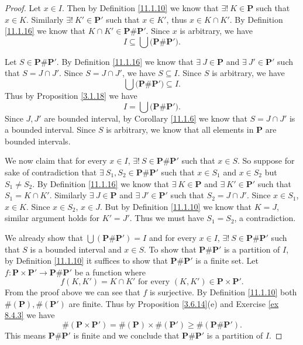 \begin{proof}
    Let \(x \in I\).
    Then by Definition \ref{11.1.10} we know that \(\exists!\ K \in \mathbf{P}\) such that \(x \in K\).
    Similarly \(\exists!\ K' \in \mathbf{P}'\) such that \(x \in K'\), thus \(x \in K \cap K'\).
    By Definition \ref{11.1.16} we know that \(K \cap K' \in \mathbf{P} \# \mathbf{P}'\).
    Since \(x\) is arbitrary, we have
    \[
        I \subseteq \bigcup \big(\mathbf{P} \# \mathbf{P}'\big).
    \]

    Let \(S \in \mathbf{P} \# \mathbf{P}'\).
    By Definition \ref{11.1.16} we know that \(\exists\ J \in \mathbf{P}\) and \(\exists\ J' \in \mathbf{P}'\) such that \(S = J \cap J'\).
    Since \(S = J \cap J'\), we have \(S \subseteq I\).
    Since \(S\) is arbitrary, we have
    \[
        \bigcup \big(\mathbf{P} \# \mathbf{P}'\big) \subseteq I.
    \]
    Thus by Proposition \ref{3.1.18} we have
    \[
        I = \bigcup \big(\mathbf{P} \# \mathbf{P}'\big).
    \]
    Since \(J, J'\) are bounded interval, by Corollary \ref{11.1.6} we know that \(S = J \cap J'\) is a bounded interval.
    Since \(S\) is arbitrary, we know that all elements in \(\mathbf{P}\) are bounded intervals.

    We now claim that for every \(x \in I\), \(\exists!\ S \in \mathbf{P} \# \mathbf{P}'\) such that \(x \in S\).
    So suppose for sake of contradiction that \(\exists\ S_1, S_2 \in \mathbf{P} \# \mathbf{P}'\) such that \(x \in S_1\) and \(x \in S_2\) but \(S_1 \neq S_2\).
    By Definition \ref{11.1.16} we know that \(\exists\ K \in \mathbf{P}\) and \(\exists\ K' \in \mathbf{P}'\) such that \(S_1 = K \cap K'\).
    Similarly \(\exists\ J \in \mathbf{P}\) and \(\exists\ J' \in \mathbf{P}'\) such that \(S_2 = J \cap J'\).
    Since \(x \in S_1\), \(x \in K\).
    Since \(x \in S_2\), \(x \in J\).
    But by Definition \ref{11.1.10} we know that \(K = J\), similar argument holds for \(K' = J'\).
    Thus we must have \(S_1 = S_2\), a contradiction.

    We already show that \(\bigcup (\mathbf{P} \# \mathbf{P}') = I\) and for every \(x \in I\), \(\exists!\ S \in \mathbf{P} \# \mathbf{P}'\) such that \(S\) is a bounded interval and \(x \in S\).
    To show that \(\mathbf{P} \# \mathbf{P}'\) is a partition of \(I\), by Definition \ref{11.1.10} it suffices to show that \(\mathbf{P} \# \mathbf{P}'\) is a finite set.
    Let \(f : \mathbf{P} \times \mathbf{P}' \to \mathbf{P} \# \mathbf{P}'\) be a function where
    \[
        f(K, K') = K \cap K' \text{ for every } (K, K') \in \mathbf{P} \times \mathbf{P}'.
    \]
    From the proof above we can see that \(f\) is surjective.
    By Definition \ref{11.1.10} both \(\#(\mathbf{P}), \#(\mathbf{P}')\) are finite.
    Thus by Proposition \ref{3.6.14}(e) and Exercise \ref{ex 8.4.3} we have
    \[
        \#(\mathbf{P} \times \mathbf{P}') = \#(\mathbf{P}) \times \#(\mathbf{P}') \geq \#(\mathbf{P} \# \mathbf{P}').
    \]
    This means \(\mathbf{P} \# \mathbf{P}'\) is finite and we conclude that \(\mathbf{P} \# \mathbf{P}'\) is a partition of \(I\).


\end{proof}
